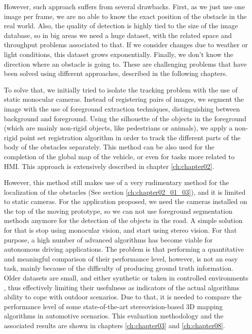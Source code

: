 However, such approach suffers from several drawbacks. First, as we just use one image per frame, we are no able to know the exact position of the obstacle in the real world. Also, the quality of detection is highly tied to the size of the image database, so in big areas we need a huge dataset, with the related space and throughput problems associated to that. If we consider changes due to weather or light conditions, this dataset grows exponentially. Finally, we don't know the direction where an obstacle is going to. These are challenging problems that have been solved using different approaches, described in the following chapters.

To solve that, we initially tried to isolate the tracking problem with the use of static monocular cameras. Instead of registering pairs of images, we segment the image with the use of foreground extraction techniques, distinguishing between background and foreground. Using the silhouette of the objects in the foreground (which are mainly non-rigid objects, like pedestrians or animals), we apply a non-rigid point set registration algorithm in order to track the different parts of the body of the obstacles separately. This method can be also used for the completion of the global map of the vehicle, or even for tasks more related to \ac{HMI}. This approach is extensively described in chapter \ref{ch:chapter02}.

However, this method still makes use of a very rudimentary method for the localization of the obstacles (See section \ref{ch:chapter02_01_03}), and it is limited to static cameras. For the application proposed, we need the cameras installed on the top of the moving prototype, so we can not use foreground segmentation methods anymore for the detection of the objects in the road. A simple solution for that is stop using monocular vision, and start using stereo vision. For that purpose, a high number of advanced algorithms has become viable for autonomous driving applications. The problem is that performing a quantitative and meaningful comparison of their performance level, however, is not an easy task, mainly because of the difficulty of producing ground truth information. Older datasets are small, and either synthetic or taken in controlled environments \citep{Scharstein2002}, thus effectively limiting their usefulness as indicators of the actual algorithms ability to cope with outdoor scenarios. Due to that, it is needed to compare the performance level of some state-of-the-art stereovision-based 3D mapping algorithms in automotive scenarios. This evaluation methodology and the associated results are shown in chapters \ref{ch:chapter03} and \ref{ch:chapter08}.

